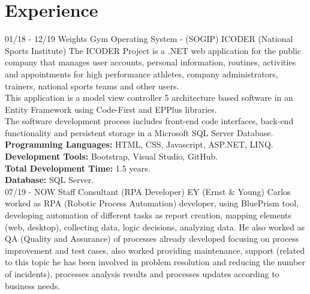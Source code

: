 \documentclass[]{friggeri-cv}
\begin{document}
\section{Experience}
\begin{entrylist}
    \entry
    {01/18 - 12/19}
    {Weights Gym Operating System - (SOGIP)}
    {ICODER (National Sports Institute)}
    {The ICODER Project is a .NET web application for the public company that manages user accounts, personal information, routines, activities and appointments for high performance athletes, company administrators, trainers, national sports teams and other users. \\
    This application is a model view controller 5 architecture based software in an Entity Framework using Code-First and EPPlus libraries. \\
    The software development process includes front-end code interfaces, back-end functionality and persistent storage in a Microsoft SQL Server Database. \\
    \textbf{Programming Languages:} HTML, CSS, Javascript, ASP.NET, LINQ. \\
    \textbf{Development Tools:} Bootstrap, Visual Studio, GitHub. \\
    \textbf{Total Development Time:} 1.5 years. \\
    \textbf{Database:} SQL Server. } \\
    
    \entry
    {07/19 - NOW}
    {Staff Consultant (RPA Developer)}
    {EY (Ernst \& Young)}
    {Carlos worked as RPA (Robotic Process Automation) developer, using BluePrism tool, developing automation of different tasks as report creation, mapping elements (web, desktop), collecting data, logic decisions, analyzing data. He also worked as QA (Quality and Assurance) of processes already developed focusing on process improvement and test cases, also worked providing maintenance, support (related to this topic he has been involved in problem resolution and reducing the number of incidents), processes analysis results and processes updates according to business needs. }
    
\end{entrylist}
\end{document}
